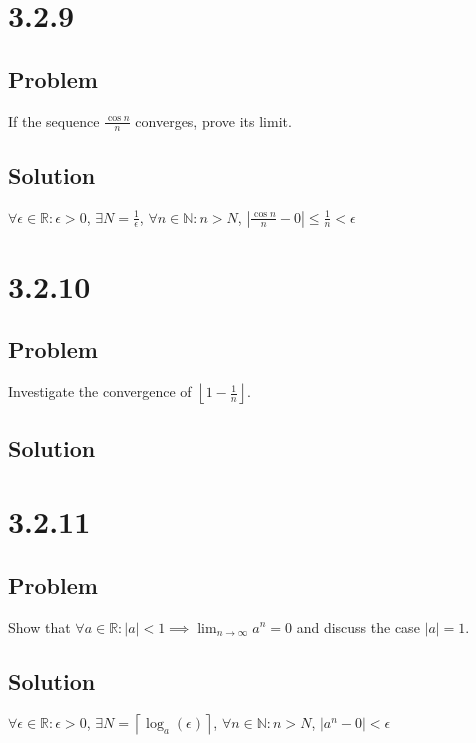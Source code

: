 \documentclass[12pt]{article}
\newcommand{\abs}  [1]{\left|       #1 \right|      }
\newcommand{\floor}[1]{\left\lfloor #1 \right\rfloor}
\newcommand{\ceil} [1]{\left\lceil  #1 \right\rceil }
\newcommand{\R}    [0]{\mathbb{R}                   }
\newcommand{\N}    [0]{\mathbb{N}                   }
\begin{document}
\section*{3.2.9}

\subsection*{Problem}
If the sequence $\frac{\cos n}{n}$ converges, prove its limit.

\subsection*{Solution}
$\forall \epsilon \in \R : \epsilon > 0$, $\exists N = \frac{1}{\epsilon}$, $\forall n \in \N : n > N$, $\abs{\frac{\cos n}{n} - 0} \leq \frac{1}{n} < \epsilon$



\section*{3.2.10}

\subsection*{Problem}
Investigate the convergence of $\floor{1 - \frac{1}{n}}$.

\subsection*{Solution}



\section*{3.2.11}

\subsection*{Problem}
Show that $\forall a \in \R : \abs{a} < 1 \implies \lim_{n \to \infty} a^n = 0$ and discuss the case $\abs{a} = 1$.

\subsection*{Solution}
$\forall \epsilon \in \R : \epsilon > 0$, $\exists N = \ceil{\log_a(\epsilon)}$, $\forall n \in \N : n > N$, $\abs{a^n - 0} < \epsilon$
\end{document}

